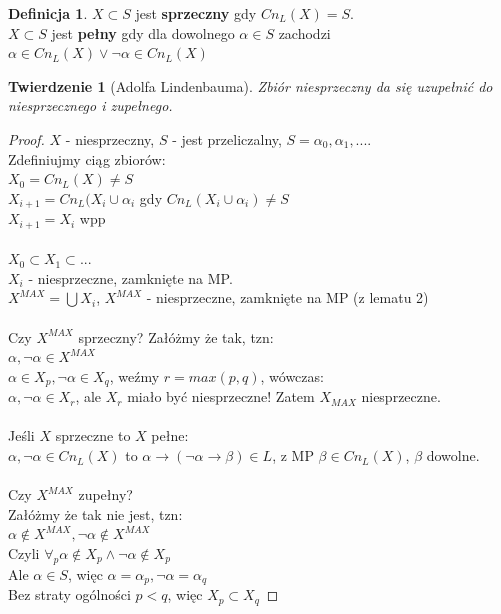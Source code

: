 \documentclass[10pt,a4paper]{article}
\theoremstyle{plain}
\newtheorem{theorem}{Twierdzenie}
\theoremstyle{definition}
\newtheorem*{definition}{Definicja}
\begin{document}
\begin{definition}
$X \subset S$ jest \textbf{sprzeczny} gdy $Cn_L(X) = S$.\\
$X \subset S$ jest \textbf{pełny} gdy dla dowolnego $\alpha \in S$ zachodzi $\alpha \in Cn_L(X) \vee \neg \alpha \in Cn_L(X)$
\end{definition}

\begin{theorem}[Adolfa Lindenbauma]
Zbiór niesprzeczny da się uzupełnić do niesprzecznego i zupełnego.
\end{theorem}
\begin{proof}
$X$ - niesprzeczny, $S$ - jest przeliczalny, $S = {\alpha_0, \alpha_1, ...}$.\\
Zdefiniujmy ciąg zbiorów:\\
$X_0 = Cn_L(X) \neq S$\\
$X_{i+1} = Cn_L(X_i \cup {\alpha_i}$ gdy $Cn_L(X_i \cup {\alpha_i}) \neq S$\\
$X_{i+1} = X_i$ wpp \\ \\
$X_0 \subset X_1 \subset ...$ \\
$X_i$ - niesprzeczne, zamknięte na MP.\\
$X^{MAX} = \bigcup X_i$, $X^{MAX}$ - niesprzeczne, zamknięte na MP (z lematu 2)\\ \\
Czy $X^{MAX}$ sprzeczny? Załóżmy że tak, tzn:\\
$\alpha, \neg \alpha \in X^{MAX}$\\
$\alpha \in X_p, \neg \alpha \in X_q$, weźmy $r = max(p, q)$, wówczas:\\
 $\alpha, \neg \alpha \in X_r$, ale $X_r$ miało być niesprzeczne! Zatem $X_{MAX}$ niesprzeczne.\\ \\
Jeśli $X$ sprzeczne to $X$ pełne:\\
$\alpha, \neg \alpha \in Cn_L(X)$ to $\alpha \rightarrow (\neg \alpha \rightarrow \beta) \in L$, z MP $\beta \in Cn_L(X)$, $\beta$ dowolne. 
\\ \\
Czy $X^{MAX}$ zupełny?\\
Załóżmy że tak nie jest, tzn:\\
$\alpha \not \in X^{MAX}, \neg \alpha \not \in X^{MAX}$\\
Czyli $\forall_p \alpha \not \in X_p \wedge \neg \alpha \not \in X_p$\\
Ale $\alpha \in S$, więc $\alpha = \alpha_p, \neg \alpha = \alpha_q$\\
Bez straty ogólności $p < q$, więc $X_p \subset X_q$


\end{proof}
\end{document}
